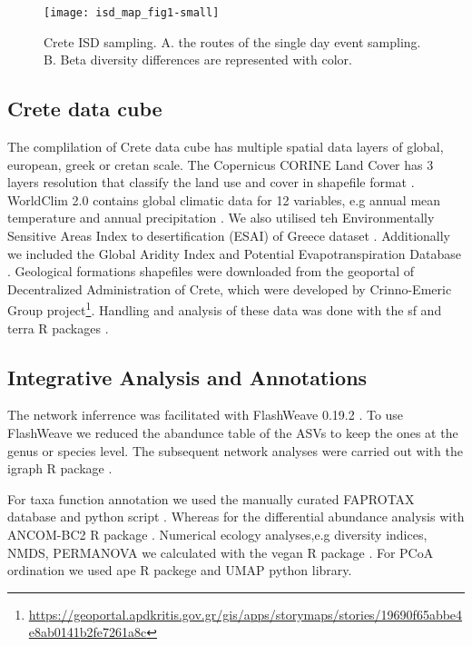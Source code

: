 \begin{figure}[t] 
    \centering\texttt{[image: isd\_map\_fig1-small]}
    \caption{Crete ISD sampling. A. the routes of the single day event sampling. B. Beta diversity differences are represented with color.}
    \label{fig:isd_crete_sampling}
\end{figure}

\subsection{Crete data cube}\label{data}

The complilation of Crete data cube has multiple spatial data layers of global,
european, greek or cretan scale. 
The Copernicus CORINE Land Cover has 3 layers resolution that classify the land
use and cover in shapefile format \parencite{CLC2023}. 
WorldClim 2.0 contains global climatic data for 12 variables, e.g annual mean
temperature and annual precipitation \parencite{Fick2017}.
We also utilised teh Environmentally Sensitive Areas Index to desertification (ESAI) 
of Greece dataset \parencite{KARAMESOUTI2018266}. Additionally we included the 
Global Aridity Index and Potential Evapotranspiration Database \parencite{zomer2022version}.
Geological formations shapefiles were downloaded from the geoportal of
Decentralized Administration of Crete, which were developed by
Crinno-Emeric Group project\footnote{\url{https://geoportal.apdkritis.gov.gr/gis/apps/storymaps/stories/19690f65abbe4e8ab0141b2fe7261a8c}}.
Handling and analysis of these data was done with the sf and terra R packages \parencite{Pebesma2023}.

\subsection{Integrative Analysis and Annotations}\label{int_analysis}
The network inferrence was facilitated with FlashWeave 0.19.2 \parencite{Tackmann2019}.
To use FlashWeave we reduced 
the abandunce table of the ASVs to keep the ones at the genus or species level.
The subsequent network analyses were carried out
with the igraph R package \parencite{Csardi2006}.

For taxa function annotation we used the manually curated FAPROTAX database and python script \parencite{loucaDecouplingFunctionTaxonomy2016}.
Whereas for the differential abundance analysis with ANCOM-BC2 R package \parencite{Lin2023}.
Numerical ecology analyses,e.g diversity indices, NMDS, PERMANOVA we calculated
with the vegan R package \parencite{oksanen2024vegan}.
For PCoA ordination we used ape R packege \parencite{Paradis2004} and UMAP python library\parencite{mcinnes2018umap-software}.

